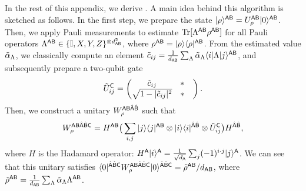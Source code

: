 In the rest of this appendix, we derive .
A main idea behind this algorithm is sketched as follows.
In the first step, we prepare the state $|\rho\rangle^{{\mathsf{A}}{\mathsf{B}}} = U_\rho^{{\mathsf{A}}{\mathsf{B}}}|0\rangle^{{\mathsf{A}}{\mathsf{B}}}$.
Then, we apply Pauli measurements to estimate $\operatorname{Tr}[\Lambda^{{\mathsf{A}}{\mathsf{B}}}\rho^{{\mathsf{A}}{\mathsf{B}}}]$ for all Pauli operators $\Lambda^{{\mathsf{A}}{\mathsf{B}}} \in \{\mathbb{I}, X, Y, Z\}^{\otimes d_{{\mathsf{A}}{\mathsf{B}}}^2}$, where $\rho^{{\mathsf{A}}{\mathsf{B}}} = |\rho\rangle\langle\rho|^{{\mathsf{A}}{\mathsf{B}}}$.
From the estimated value $\tilde{\alpha}_\Lambda$, we classically compute an element $\tilde{c}_{ij} = \frac{1}{d_{{\mathsf{A}}{\mathsf{B}}}}\sum_\Lambda \tilde{\alpha}_\Lambda \langle i|\Lambda|j\rangle^{{\mathsf{A}}{\mathsf{B}}}$, and subsequently prepare a two-qubit gate
\begin{align}
\til{U}_{ij}^{\sC} = 
\begin{pmatrix} 
\til{c}_{ij} & * \ \ \ \\
\sqrt{1 - |\til{c}_{ij}|^2} & * \ \ \ 
\end{pmatrix}.
\end{align}
Then, we construct a unitary $W_\rho^{{\mathsf{A}}{\mathsf{B}}\hat{{\mathsf{A}}}\hat{{\mathsf{B}}}}$ such that
\begin{align}
    W_\rho^{{\mathsf{A}}{\mathsf{B}}\hat{{\mathsf{A}}}\hat{{\mathsf{B}}}{\mathsf{C}}} = H^{{\mathsf{A}}{\mathsf{B}}} \big( \sum_{i, j} |j\rangle\langle j|^{{\mathsf{A}}{\mathsf{B}}} \otimes |i\rangle\langle i|^{\hat{{\mathsf{A}}}\hat{{\mathsf{B}}}} \otimes \tilde{U}_{ij}^{\mathsf{C}} \big) H^{\hat{{\mathsf{A}}}\hat{{\mathsf{B}}}},
\end{align}
where $H$ is the Hadamard operator: $H^{\mathsf{A}}|i\rangle^{\mathsf{A}} = \frac{1}{\sqrt{d_{\mathsf{A}}}}\sum_j (-1)^{i\cdot j}|j\rangle^{\mathsf{A}}$.
We can see that this unitary satisfies $\langle0|^{\hat{{\mathsf{A}}}\hat{{\mathsf{B}}}{\mathsf{C}}}W_\rho^{{\mathsf{A}}{\mathsf{B}}\hat{{\mathsf{A}}}\hat{{\mathsf{B}}}{\mathsf{C}}}|0\rangle^{\hat{{\mathsf{A}}}\hat{{\mathsf{B}}}{\mathsf{C}}} = \tilde{\rho}^{{\mathsf{A}}{\mathsf{B}}}/d_{{\mathsf{A}}{\mathsf{B}}}$, where $\tilde{\rho}^{{\mathsf{A}}{\mathsf{B}}} = \frac{1}{d_{{\mathsf{A}}{\mathsf{B}}}}\sum_\Lambda \tilde{\alpha}_\Lambda \Lambda^{{\mathsf{A}}{\mathsf{B}}}$.


